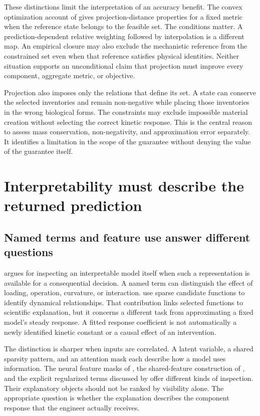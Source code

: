 These distinctions limit the interpretation of an accuracy benefit. The convex optimization account of \citet{Boyd2004} gives projection-distance properties for a fixed metric when the reference state belongs to the feasible set. The conditions matter. A prediction-dependent relative weighting followed by interpolation is a different map. An empirical closure may also exclude the mechanistic reference from the constrained set even when that reference satisfies physical identities. Neither situation supports an unconditional claim that projection must improve every component, aggregate metric, or objective.

Projection also imposes only the relations that define its set. A state can conserve the selected inventories and remain non-negative while placing those inventories in the wrong biological forms. The constraints may exclude impossible material creation without selecting the correct kinetic response. This is the central reason to assess mass conservation, non-negativity, and approximation error separately. It identifies a limitation in the scope of the guarantee without denying the value of the guarantee itself.

\section{Interpretability must describe the returned prediction}

\subsection{Named terms and feature use answer different questions}

\citet{Rudin2019} argues for inspecting an interpretable model itself when such a representation is available for a consequential decision. A named term can distinguish the effect of loading, operation, curvature, or interaction. \citet{Brunton2016} use sparse candidate functions to identify dynamical relationships. That contribution links selected functions to scientific explanation, but it concerns a different task from approximating a fixed model's steady response. A fitted response coefficient is not automatically a newly identified kinetic constant or a causal effect of an intervention.

The distinction is sharper when inputs are correlated. A latent variable, a shared sparsity pattern, and an attention mask each describe how a model uses information. The neural feature masks of \citet{ArikPfister2021}, the shared-feature construction of \citet{Argyriou2008}, and the explicit regularized terms discussed by \citet{Hastie2009} offer different kinds of inspection. Their explanatory objects should not be ranked by visibility alone. The appropriate question is whether the explanation describes the component response that the engineer actually receives.

